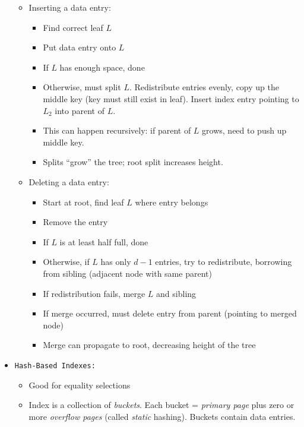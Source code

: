 \documentclass[landscape,8pt]{extarticle}
\newcommand{\code}{\lstinline}
\begin{document}
\begin{multicols}{4}
\begin{itemize}
\begin{itemize}
                  \item Inserting a data entry:
                        \begin{itemize}
                            \item Find correct leaf $L$
                            \item Put data entry onto $L$
                            \item If $L$ has enough space, done
                            \item Otherwise, must split $L$. Redistribute entries evenly, copy up the middle key (key must still exist in leaf). Insert index entry pointing to $L_2$ into parent of $L$.
                            \item This can happen recursively: if parent of $L$ grows, need to push up middle key.
                            \item Splits ``grow'' the tree; root split increases height.
                        \end{itemize}
                  \item Deleting a data entry:
                        \begin{itemize}
                            \item Start at root, find leaf $L$ where entry belongs
                            \item Remove the entry
                            \item If $L$ is at least half full, done
                            \item Otherwise, if $L$ has only $d-1$ entries, try to redistribute, borrowing from sibling (adjacent node with same parent)
                            \item If redistribution fails, merge $L$ and sibling
                            \item If merge occurred, must delete entry from parent (pointing to merged node)
                            \item Merge can propagate to root, decreasing height of the tree
                        \end{itemize}
              \end{itemize}
        \item \code{Hash-Based Indexes:}
              \begin{itemize}
                  \item Good for equality selections
                  \item Index is a collection of \emph{buckets}. Each bucket = \emph{primary page} plus zero or more \emph{overflow pages} (called \emph{static} hashing). Buckets contain data entries.

\end{itemize}
\end{itemize}
\end{multicols}
\end{document}
